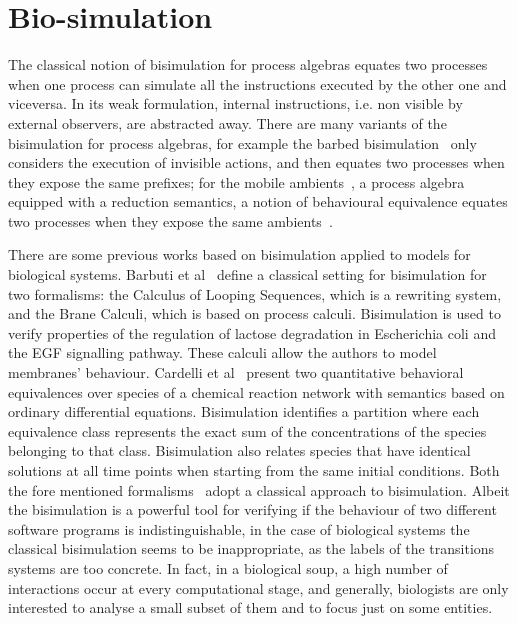 \section{Bio-simulation}
\label{sec:biosimulation}

The classical notion of bisimulation for process algebras equates two processes
when one process can simulate all the instructions executed by the other one and viceversa.
In its weak formulation, internal instructions, i.e. non visible by external observers,
are abstracted away. 
There are many variants of the bisimulation for process algebras,  for example the
barbed bisimulation~\cite{10.1007/3-540-55719-9_114} only considers the execution of invisible actions, and then equates two processes when they expose the same prefixes; for the mobile ambients~\cite{CardelliG00}, a process algebra equipped with a reduction semantics, a notion of
behavioural equivalence equates two processes when they expose the same ambients~\cite{GC03}. 

There are some previous works based on bisimulation applied to models for biological systems. Barbuti et al~\cite{BMMT08} define a classical setting for bisimulation for two formalisms: the Calculus of Looping Sequences, which is a rewriting system, and the Brane Calculi, which is based on process calculi.
Bisimulation is used to verify properties of the regulation of lactose degradation in
Escherichia coli and the EGF signalling pathway. These calculi allow the authors to model membranes' behaviour.
Cardelli et al~\cite{CTTV15} present two quantitative behavioral equivalences over species of a 
chemical reaction network with semantics based on ordinary differential equations.
Bisimulation identifies a partition where each equivalence class represents the exact sum of the concentrations of the species belonging to that class.
Bisimulation also relates species that have identical solutions at all time points when starting from the same initial conditions.
Both the fore mentioned formalisms~\cite{BMMT08,CTTV15} adopt a classical approach to bisimulation. 
Albeit the bisimulation is a powerful tool for verifying if the behaviour of two different software 
programs is indistinguishable, in the case of biological systems the classical bisimulation seems to be inappropriate, as the labels of the transitions systems are too concrete.
In fact, in a biological soup, a high number of interactions occur at every computational stage, and generally, biologists
are only interested to analyse a small subset of them and to focus just on some entities.

